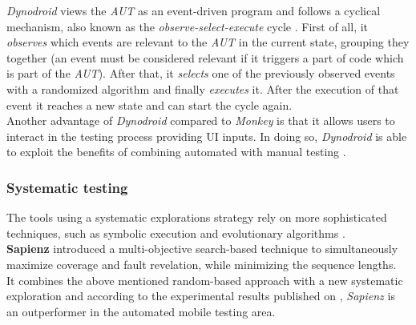 \textit{Dynodroid }views the \textit{AUT} as an event-driven program and follows a cyclical mechanism, also known as the \textit{observe-select-execute} cycle \cite{dynodroid}. First of all, it \textit{observes} which events are relevant to the \textit{AUT} in the current state, grouping they together (an event must be considered relevant if it triggers a part of code which is part of the \textit{AUT}). After that, it \textit{selects} one of the previously observed events with a randomized algorithm \cite{dynodroid, areWeThereYet} and finally \textit{executes} it. After the execution of that event it reaches a new state and can start the cycle again. \\
Another advantage of \textit{Dynodroid} compared to \textit{Monkey} is that it allows users to interact in the testing process providing UI inputs. In doing so, \textit{Dynodroid} is able to exploit the benefits of combining automated with manual testing \cite{dynodroid}.

\subsubsection{Systematic testing}
The tools using a systematic explorations strategy rely on more sophisticated techniques, such as symbolic execution and evolutionary algorithms \cite{areWeThereYet}. \\
\textbf{Sapienz} \cite{sapienz} introduced a multi-objective search-based technique to simultaneously maximize coverage and fault revelation, while minimizing the sequence lengths. \\ It combines the above mentioned random-based approach with a new systematic exploration and according to the experimental results published on \cite{sapienz}, \textit{Sapienz} is an outperformer in the automated mobile testing area.




